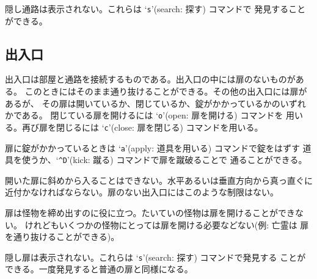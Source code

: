 隠し通路は表示されない。これらは `{\tt s}'(search: 探す) コマンドで
発見することができる。

\subsection*{出入口}

出入口は部屋と通路を接続するものである。出入口の中には扉のないものがある。
このときにはそのまま通り抜けることができる。その他の出入口には扉があるが、
その扉は開いているか、閉じているか、錠がかかっているかのいずれかである。
閉じている扉を開けるには `{\tt o}'(open: 扉を開ける) コマンドを
用いる。再び扉を閉じるには `{\tt c}'(close: 扉を閉じる) コマンドを用いる。

扉に錠がかかっているときは `{\tt a}'(apply: 道具を用いる) コマンドで錠をはずす
道具を使うか、`{\tt \^{}D}'(kick: 蹴る) コマンドで扉を蹴破ることで
通ることができる。

開いた扉に斜めから入ることはできない。水平あるいは垂直方向から真っ直ぐに
近付かなければならない。扉のない出入口にはこのような制限はない。

扉は怪物を締め出すのに役に立つ。たいていの怪物は扉を開けることができない。
けれどもいくつかの怪物にとっては扉を開ける必要などない(例: 亡霊は
扉を通り抜けることができる)。

隠し扉は表示されない。これらは `{\tt s}'(search: 探す) コマンドで発見する
ことができる。一度発見すると普通の扉と同様になる。

